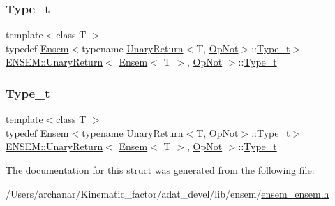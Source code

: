 \subsubsection{\texorpdfstring{Type\_t}{Type\_t}\hspace{0.1cm}{\footnotesize\ttfamily [1/2]}}
{\footnotesize\ttfamily template$<$class T $>$ \\
typedef \mbox{\hyperlink{classENSEM_1_1Ensem}{Ensem}}$<$typename \mbox{\hyperlink{structENSEM_1_1UnaryReturn}{Unary\+Return}}$<$T, \mbox{\hyperlink{structENSEM_1_1OpNot}{Op\+Not}}$>$\+::\mbox{\hyperlink{structENSEM_1_1UnaryReturn_3_01Ensem_3_01T_01_4_00_01OpNot_01_4_a858a31d9b2f5ae17601e7f83f0a58f5a}{Type\+\_\+t}}$>$ \mbox{\hyperlink{structENSEM_1_1UnaryReturn}{E\+N\+S\+E\+M\+::\+Unary\+Return}}$<$ \mbox{\hyperlink{classENSEM_1_1Ensem}{Ensem}}$<$ T $>$, \mbox{\hyperlink{structENSEM_1_1OpNot}{Op\+Not}} $>$\+::\mbox{\hyperlink{structENSEM_1_1UnaryReturn_3_01Ensem_3_01T_01_4_00_01OpNot_01_4_a858a31d9b2f5ae17601e7f83f0a58f5a}{Type\+\_\+t}}}

\mbox{\label{structENSEM_1_1UnaryReturn_3_01Ensem_3_01T_01_4_00_01OpNot_01_4_a858a31d9b2f5ae17601e7f83f0a58f5a}} 
\subsubsection{\texorpdfstring{Type\_t}{Type\_t}\hspace{0.1cm}{\footnotesize\ttfamily [2/2]}}
{\footnotesize\ttfamily template$<$class T $>$ \\
typedef \mbox{\hyperlink{classENSEM_1_1Ensem}{Ensem}}$<$typename \mbox{\hyperlink{structENSEM_1_1UnaryReturn}{Unary\+Return}}$<$T, \mbox{\hyperlink{structENSEM_1_1OpNot}{Op\+Not}}$>$\+::\mbox{\hyperlink{structENSEM_1_1UnaryReturn_3_01Ensem_3_01T_01_4_00_01OpNot_01_4_a858a31d9b2f5ae17601e7f83f0a58f5a}{Type\+\_\+t}}$>$ \mbox{\hyperlink{structENSEM_1_1UnaryReturn}{E\+N\+S\+E\+M\+::\+Unary\+Return}}$<$ \mbox{\hyperlink{classENSEM_1_1Ensem}{Ensem}}$<$ T $>$, \mbox{\hyperlink{structENSEM_1_1OpNot}{Op\+Not}} $>$\+::\mbox{\hyperlink{structENSEM_1_1UnaryReturn_3_01Ensem_3_01T_01_4_00_01OpNot_01_4_a858a31d9b2f5ae17601e7f83f0a58f5a}{Type\+\_\+t}}}



The documentation for this struct was generated from the following file\+:\begin{DoxyCompactItemize}
\item 
/\+Users/archanar/\+Kinematic\+\_\+factor/adat\+\_\+devel/lib/ensem/\mbox{\hyperlink{lib_2ensem_2ensem__ensem_8h}{ensem\+\_\+ensem.\+h}}\end{DoxyCompactItemize}
